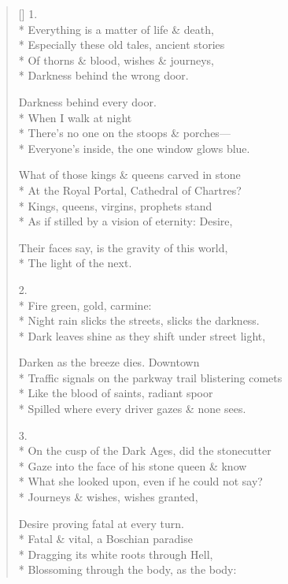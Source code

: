 \label{ch:art_histories}
\settowidth{\versewidth}{                                   Fire green, gold, carmine:}
\begin{verse}[\versewidth]
1.\\*
Everything is a matter of life \& death,\\*
Especially these old tales, ancient stories\\*
Of thorns \& blood, wishes \& journeys,\\*
Darkness behind the wrong door.

Darkness behind every door.\\*
When I walk at night\\*
There's no one on the stoops \& porches---\\*
Everyone's inside, the one window glows blue.

What of those kings \& queens carved in stone\\*
At the Royal Portal, Cathedral of Chartres?\\*
Kings, queens, virgins, prophets stand\\*
As if stilled by a vision of eternity: Desire,

Their faces say, is the gravity of this world,\\*
The light of the next.

2.\\*
                                   Fire green, gold, carmine:\\*
Night rain slicks the streets, slicks the darkness.\\*
Dark leaves shine as they shift under street light,

Darken as the breeze dies. Downtown\\*
Traffic signals on the parkway trail blistering comets\\*
Like the blood of saints, radiant spoor \\*
Spilled where every driver gazes \& none sees.

3.\\*
On the cusp of the Dark Ages, did the stonecutter\\*
Gaze into the face of his stone queen \& know\\*
What she looked upon, even if he could not say?\\*
Journeys \& wishes, wishes granted,

Desire proving fatal at every turn.\\*
Fatal \& vital, a Boschian paradise\\*
Dragging its white roots through Hell,\\*
Blossoming through the body, as the body:


\end{verse}
